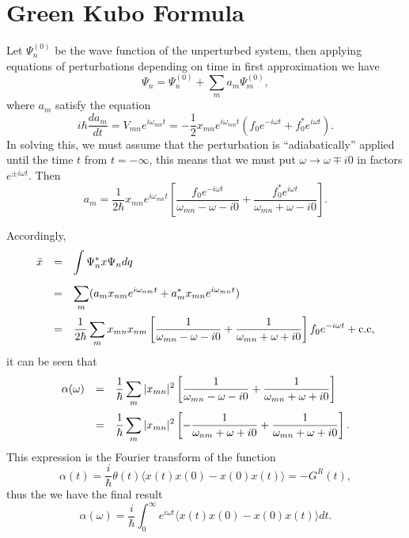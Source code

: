 \documentclass{book}
\newcommand{\average}[1]{\langle#1\rangle}
\numberwithin{equation}{section}
\begin{document}
\section{Green Kubo Formula}
Let $\Psi^{(0)}_n$ be the wave function of the unperturbed system,
then applying equations of perturbations depending on time in first
approximation we have
\begin{equation}
  \Psi_n=\Psi^{(0)}_n+\sum_ma_{m}\Psi^{(0)}_m,
\end{equation}
where $a_m$ satisfy the equation
\begin{equation}
  i\hbar\frac{da_m}{dt}=V_{mn}e^{i\omega_{mn}t}=-\frac{1}{2}
  x_{mn}e^{i\omega_{mn}t}(f_0e^{-i\omega t}+f_0^*e^{i\omega t}).
\end{equation}
In solving this, we must assume that the perturbation is ``adiabatically''
applied until the time $t$ from $t=-\infty$, this means that we must put
$\omega\to\omega\mp i0$ in factors $e^{\pm i\omega t}$. Then
\begin{equation}
  a_m=\frac{1}{2\hbar}x_{mn}e^{i\omega_{mn}t}\left[
    \frac{f_0e^{-i\omega t}}{\omega_{mn}-\omega-i0}+
    \frac{f_0^*e^{i\omega t}}{\omega_{mn}+\omega-i0}\right].
\end{equation}

Accordingly,
\begin{equation}
  \begin{array}{rcl}
    \bar{x}&=&\displaystyle\int \Psi_n^*x\Psi_ndq\\\vbox to 20pt{}
    &=&\displaystyle\sum_m(a_mx_{nm}e^{i\omega_{nm}t}+
    a^*_{m}x_{mn}e^{i\omega_{mn}t})\\\vbox to 20pt{}
    &=&\displaystyle\frac{1}{2\hbar}\sum_mx_{mn}x_{nm}\left[
      \frac{1}{\omega_{mn}-\omega-i0}+\frac{1}{\omega_{mn}+\omega+i0}
      \right]f_0e^{-i\omega t}+\hbox{c.c},
  \end{array}
\end{equation}
it can be seen that
\begin{equation}
  \begin{array}{rcl}
    \alpha(\omega)&=&\displaystyle\frac{1}{\hbar}\sum_m|x_{mn}|^2\left[
      \frac{1}{\omega_{mn}-\omega-i0}+\frac{1}{\omega_{mn}+\omega+i0}
      \right]\\\vbox to 20pt{}
    &=&\displaystyle\frac{1}{\hbar}\sum_m|x_{mn}|^2\left[
      -\frac{1}{\omega_{nm}+\omega+i0}+\frac{1}{\omega_{mn}+\omega+i0}
      \right].
  \end{array}
\end{equation}
This expression is the Fourier transform of the function
\begin{equation}
  \alpha(t)=\frac{i}{\hbar}\theta(t)\average{x(t)x(0)-x(0)x(t)}=-G^R(t),
\end{equation}
thus the we have the final result
\begin{equation}
  \alpha(\omega)=\frac{i}{\hbar}\int_0^\infty e^{i\omega t}
  \average{x(t)x(0)-x(0)x(t)}dt.
\end{equation}
\end{document}
